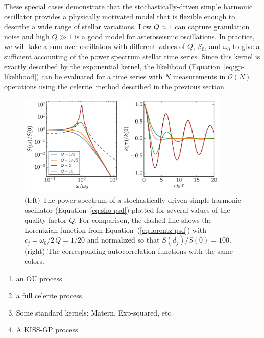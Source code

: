 \documentclass[manuscript, letterpaper]{aastex6}
\makeatletter
\let\origsection\section
\renewcommand\section{\@ifstar{\starsection}{\nostarsection}}
\newcommand\nostarsection[1]{\sectionprelude\origsection{#1}}
\newcommand\starsection[1]{\sectionprelude\origsection*{#1}}
\newcommand\sectionprelude{\vspace{1em}}
\newcommand{\project}[1]{\textsf{#1}}
\newcommand{\celerite}{\project{celerite}}
\newcommand{\figurelabel}[1]{\label{fig:#1}}
\renewcommand{\eqref}[1]{\ref{eq:#1}}
\newcommand{\Eq}[1]{Equation~(\eqref{#1})}
\newcommand{\eq}[1]{\Eq{#1}}
\newcommand{\eqalt}[1]{Equation~\eqref{#1}}
\makeatother
\begin{document}
These special cases demonstrate that the stochastically-driven simple harmonic
oscillator provides a physically motivated model that is flexible enough to
describe a wide range of stellar variations.
Low $Q \approx 1$ can capture granulation noise and high $Q \gg 1$ is a good
model for asteroseismic oscillations.
In practice, we will take a sum over oscillators with different values of $Q$,
$S_0$, and $\omega_0$ to give a sufficient accounting of the power spectrum
stellar time series.
Since this kernel is exactly described by the exponential kernel, the
likelihood (\eqalt{gp-likelihood}) can be evaluated for a time series with $N$
measurements in $\mathcal{O}(N)$ operations using the \celerite\ method described
in the previous section.

\begin{figure}[!htbp]
\begin{center}
\includegraphics[width=0.9\textwidth]{figures/sho.pdf}
\caption{(left) The power spectrum of a stochastically-driven simple harmonic
    oscillator (\eqalt{sho-psd}) plotted for several values of the quality
    factor $Q$.
    For comparison, the dashed line shows the Lorentzian function from
    \eq{lorentz-psd} with $c_j = \omega_0/2\,Q = 1/20$ and normalized so that
    $S(d_j)/S(0) = 100$.
    (right) The corresponding autocorrelation functions with the same colors.
    \figurelabel{sho}}
\end{center}
\end{figure}


\section{Examples with simulated data}

\begin{enumerate}
\item an OU process
\item a full celerite process
\item Some standard kernels: Matern, Exp-squared, etc.
\item A KISS-GP process
\end{enumerate}
\end{document}
